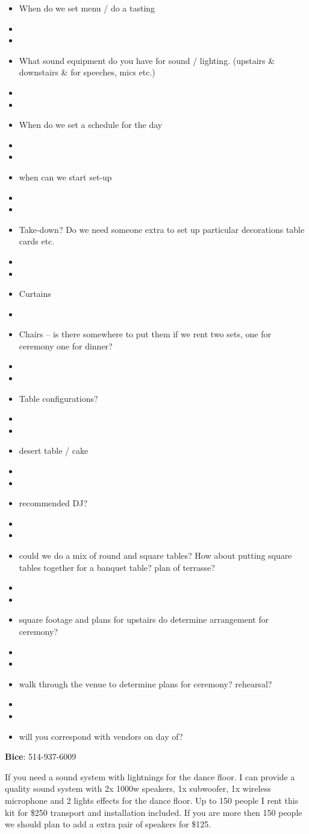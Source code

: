 \documentclass[10pt]{article}
\begin{document}
\begin{wedding}
\begin{itemize}\squishlist
\setlength{\parindent}{.25in}
\item When do we set menu / do a tasting
\item\item\item What sound equipment do you have for sound / lighting. (upstairs \& downstairs \& for speeches, mics etc.)
\item\item\item When do we set a schedule for the day
\item\item\item when can we start set-up
\item\item\item Take-down? Do we need someone extra to set up particular decorations table cards etc.
\item\item\item Curtains
\item\item Chairs -- is there somewhere to put them if we rent two sets, one for ceremony one for dinner?
\item\item\item Table configurations?
\item\item\item desert table / cake
\item\item\item recommended DJ?
\item\item\item could we do a mix of round and square tables? How about putting square tables together for a banquet table? plan of terrasse?
\item\item\item square footage and plans for upstairs do determine arrangement for ceremony?
\item\item\item walk through the venue to determine plans for ceremony? rehearsal?
\item\item\item will you correspond with vendors on day of?
\end{itemize}

\noindent \textbf{Bice}: 514-937-6009

If you need a sound system with lightnings for the dance floor. I can provide a quality sound system with 2x 1000w speakers, 1x subwoofer, 1x wireless microphone and 2 lights effects for the dance floor. Up to 150 people I rent this kit for \$250 transport and installation included. If you are more then 150 people we should plan to add a extra pair of speakers for \$125.


\end{wedding}
\end{document}
